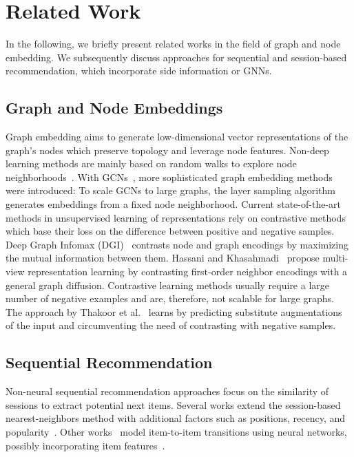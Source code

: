 \section{Related Work}
In the following, we briefly present related works in the field of graph and node embedding. We subsequently discuss approaches for sequential and session-based recommendation, which incorporate side information or GNNs.


\subsection{Graph and Node Embeddings}
Graph embedding aims to generate low-dimensional vector representations of the graph's nodes which preserve topology and leverage node features. Non-deep learning methods are mainly based on random walks to explore node neighborhoods~\cite{perozzi2014deepwalk,tang2015line,grover2016node2vec}. With GCNs~\cite{kipf2016semi,velickovic2018graph}, more sophisticated graph embedding methods were introduced: To scale GCNs to large graphs, the layer sampling algorithm~\cite{hamilton2017inductive} generates embeddings from a fixed node neighborhood. Current state-of-the-art methods in unsupervised learning of representations rely on contrastive methods which base their loss on the difference between positive and negative samples. Deep Graph Infomax (DGI)~\cite{velickovic2019deep} contrasts node and graph encodings by maximizing the mutual information between them. Hassani and Khasahmadi~\cite{hassani2020contrastive} propose multi-view representation learning by contrasting first-order neighbor encodings with a general graph diffusion. %
Contrastive learning methods usually require a large number of negative examples and are, therefore, not scalable for large graphs. The approach by Thakoor et al.~\cite{thakoor2021bootstrapped} learns by predicting substitute augmentations of the input and circumventing the need of contrasting with negative samples.

\subsection{Sequential Recommendation}
Non-neural sequential recommendation approaches focus on the similarity of sessions to extract potential next items. Several works extend the session-based nearest-neighbors method with additional factors such as positions, recency, and popularity~\cite{ludewig2021empirical,ludewig2018effective,jannach2017recurrent,garg2019sequence}. Other works~\cite{tan2016improved,li2017neural,liu2018stamp,kang2018self} model item-to-item transitions using neural networks, possibly incorporating item features~\cite{hidasi2016parallel,zhang2019feature,de2021transformers4rec}.

